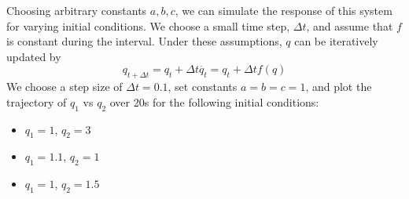\documentclass[12pt]{article}
\begin{document}
	Choosing arbitrary constants $a, b, c$, we can simulate the response of this system for varying initial conditions. We choose a small time step, $\Delta t$, and assume that $f$ is constant during the interval. Under these assumptions, $q$ can be iteratively updated by
	$$q_{t + \Delta t} = q_t + \Delta t \dot{q_t} = q_t + \Delta t f(q)$$
	We choose a step size of $\Delta t = 0.1$, set constants $a = b = c = 1$, and plot the trajectory of $q_1$ vs $q_2$ over 20s for the following initial conditions:
	\begin{itemize}
		\item $q_1 = 1$, $q_2 = 3$
		\item $q_1 = 1.1$, $q_2 = 1$
		\item $q_1 = 1$, $q_2 = 1.5$
	\end{itemize}
\end{document}
